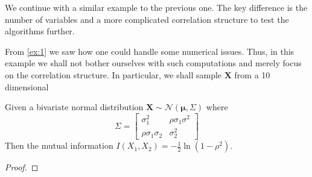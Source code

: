 \documentclass[../Thesis.tex]{subfiles}
\begin{document}
We continue with a similar example to the previous one. The key difference is the number of variables and a more complicated correlation structure to test the algorithms further.
\begin{example}
    From \autoref{ex:1} we saw how one could handle some numerical issues. Thus, in this example we shall not bother ourselves with such computations and merely focus on the correlation structure. In particular, we shall sample $\boldsymbol X$ from a 10 dimensional 
\end{example}


\newpage
\begin{proposition} \label{prop:MI bivariate gaussian}
    Given a bivariate normal distribution $\boldsymbol X \sim \mathcal{N}\left(\boldsymbol \mu,  \Sigma\right)$ where
    $$\Sigma =
        \begin{bmatrix}
            \sigma_1^2             & \rho \sigma_1 \sigma^2 \\
            \rho \sigma_1 \sigma_2 & \sigma_2^2
        \end{bmatrix}
    $$
    Then the mutual information $I\left(X_1, X_2\right) = -\frac{1}{2}\ln \left(1 - \rho^2\right)$.
\end{proposition}
\begin{proof}

\end{proof}
\end{document}
